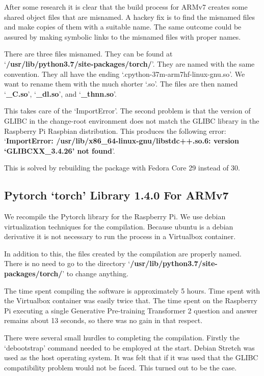 After some research it is clear that the build process for ARMv7 creates some shared object files that are misnamed. A hackey fix is to find the misnamed files and make copies of them with a suitable name. The same outcome could be assured by making symbolic links to the misnamed files with proper names.

There are three files misnamed. They can be found at `\textbf{/usr/lib/python3.7/site-packages/torch/}'. They are named with the same convention. They all have the ending `.cpython-37m-arm7hf-linux-gnu.so'. We want to rename them with the much shorter `.so'. The files are then named `\textbf{\_C.so}', `\textbf{\_dl.so}', and `\textbf{\_thnn.so}'.

This takes care of the `ImportError'. The second problem is that the version of GLIBC in the change-root environment does not match the GLIBC library in the Raspberry Pi Raspbian distribution. This produces the following error: `\textbf{ImportError: /usr/lib/x86\_64-linux-gnu/libstdc++.so.6: version `GLIBCXX\_3.4.26' not found}'.

This is solved by rebuilding the package with Fedora Core 29 instead of 30. 
 
\subsection*{Pytorch `torch' Library 1.4.0 For ARMv7}
We recompile the Pytorch library for the Raspberry Pi. We use debian virtualization techniques for the compilation. Because ubuntu is a debian derivative it is not necessary to run the process in a Virtualbox container. 

In addition to this, the files created by the compilation are properly named. There is no need to go to the directory `\textbf{/usr/lib/python3.7/site-packages/torch/}' to change anything. 

The time spent compiling the software is approximately 5 hours. Time spent with the Virtualbox container was easily twice that. The time spent on the Raspberry Pi executing a single Generative Pre-training Transformer 2 question and answer remains about 13 seconds, so there was no gain in that respect.

There were several small hurdles to completing the compilation. Firstly the `debootstrap' command needed to be employed at the start. Debian Stretch was used as the host operating system. It was felt that if it was used that the GLIBC compatibility problem would not be faced. This turned out to be the case.

